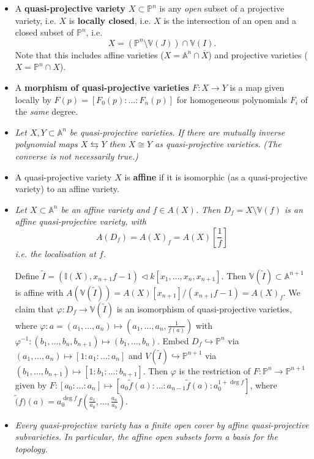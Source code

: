 \documentclass[10pt]{article}
\newcommand{\van}{\mathbb{V}}
\newcommand{\ide}{\mathbb{I}}
\newcommand{\aff}{\mathbb{A}}
\newcommand{\pee}{\mathbb{P}}
\begin{document}
            \begin{itemize}
                \item A \textbf{quasi-projective variety $X\subset\pee^n$} is any \emph{open} subset of a projective variety, i.e. $X$ is \textbf{locally closed}, i.e. $X$ is the intersection of an open and a closed subset of $\pee^n$, i.e.
                    \begin{equation*}
                        X=(\pee^n\setminus\van(J))\cap\van(I).
                    \end{equation*}
                    Note that this includes affine varieties ($X=\aff^n\cap\overline{X}$) and projective varieties ($X=\pee^n\cap X$).
                \item A \textbf{morphism of quasi-projective varieties $F\colon X\to Y$} is a map given locally by $F(p)=[F_0(p):\ldots:F_n(p)]$ for homogeneous polynomials $F_i$ of the \emph{same} degree.
                \item \emph{Let $X,Y\subset\aff^n$ be quasi-projective varieties.}
                    \emph{If there are mutually inverse polynomial maps $X\leftrightarrows Y$ then $X\cong Y$ as quasi-projective varieties.}
                    \emph{(The converse is not necessarily true.)}
                \item A quasi-projective variety $X$ is \textbf{affine} if it is isomorphic (as a quasi-projective variety) to an affine variety.
                \item \emph{Let $X\subset\aff^n$ be an affine variety and $f\in A(X)$.}
                    \emph{Then $D_f=X\setminus\van(f)$ is an affine quasi-projective variety, with}
                    \begin{equation*}
                        A(D_f)=A(X)_f=A(X)\left[\frac{1}{f}\right]
                    \end{equation*}
                    \emph{i.e. the localisation at $f$.}

                    Define $\widetilde{I}=(\ide(X),x_{n+1}f-1)\triangleleft k[x_1,\ldots,x_n,x_{n+1}]$.
                    Then $\van(\widetilde{I})\subset\aff^{n+1}$ is affine with $A(\van(\widetilde{I}))=A(X)[x_{n+1}]/(x_{n+1}f-1)=A(X)_f$.
                    We claim that $\varphi\colon D_f\to\van(\widetilde{I})$ is an isomorphism of quasi-projective varieties, where $\varphi\colon a=(a_1,\ldots,a_n)\mapsto\left(a_1,\ldots,a_n,\frac{1}{f(a)}\right)$ with $\varphi^{-1}\colon(b_1,\ldots,b_n,b_{n+1})\mapsto(b_1,\ldots,b_n)$.
                    Embed $D_f\hookrightarrow\pee^n$ via $(a_1,\ldots,a_n)\mapsto[1:a_1:\ldots:a_n]$ and $V(\widetilde{I})\hookrightarrow\pee^{n+1}$ via $(b_1,\ldots,b_{n+1})\mapsto[1:b_1:\ldots:b_{n+1}]$.
                    Then $\varphi$ is the restriction of $F\colon\pee^n\to\pee^{n+1}$ given by $F\colon[a_0:\ldots:a_n]\mapsto[a_0\tilde{f}(a):\ldots:a_{n-1}\tilde{f}(a):a_0^{1+\deg f}]$, where $\tilde(f)(a)=a_0^{\deg f}f\left(\frac{a_1}{a_0},\ldots,\frac{a_n}{a_0}\right)$.
                    \item \emph{Every quasi-projective variety has a finite open cover by affine quasi-projective subvarieties.}
                        \emph{In particular, the affine open subsets form a basis for the topology.}


\end{itemize}
\end{document}
